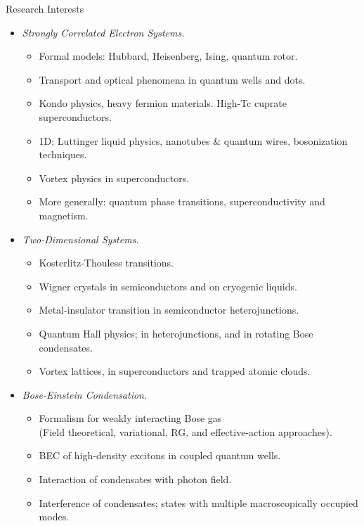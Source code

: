 \documentclass[12pt]{article}
\begin{document}
\begin{center}
{\sc \LARGE Research Interests}
\end{center}

\vspace{0.5cm}


\vspace{0.5cm}


\begin{itemize}


\item {\large \it Strongly Correlated Electron Systems.}  
\begin{itemize}
\addtolength{\itemsep}{-\itemsep}   
\item Formal models: Hubbard, Heisenberg, Ising, quantum
rotor. 
\item Transport and optical phenomena in quantum wells and dots.  
\item Kondo physics, heavy fermion materials.  High-Tc
cuprate superconductors.
\item 1D: Luttinger liquid physics, nanotubes \& quantum
wires, bosonization techniques. 
\item Vortex physics in superconductors.  
\item More generally: quantum phase transitions, superconductivity and
magnetism.
\end{itemize}

\item {\large \it Two-Dimensional Systems.}
\begin{itemize}
\addtolength{\itemsep}{-\itemsep}   
\item Kosterlitz-Thouless transitions. 
\item Wigner crystals in semiconductors and on cryogenic liquids.
\item Metal-insulator transition in semiconductor heterojunctions.
\item Quantum Hall physics; in heterojunctions, and in
rotating Bose condensates.
\item Vortex lattices, in superconductors and trapped atomic clouds.
\end{itemize}



\item {\large \it  Bose-Einstein Condensation.}
\begin{itemize}
\addtolength{\itemsep}{-\itemsep}   
\item Formalism for weakly interacting Bose gas \\ 
(Field theoretical, variational, RG, and effective-action approaches).
\item BEC of high-density excitons in coupled quantum wells.  
\item Interaction of condensates with photon field.
\item Interference of condensates;  states with multiple
macroscopically occupied modes. 
\end{itemize}




\end{itemize}
\end{document}
